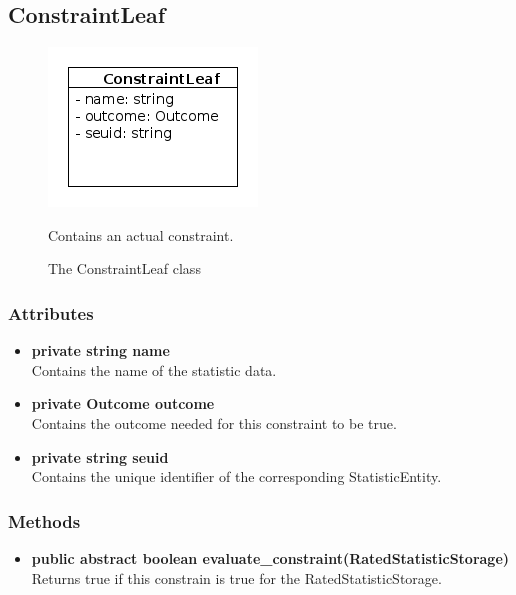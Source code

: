 \subsection{ConstraintLeaf}
\begin{figure}[htbp]
	\begin{minipage}[t]{8cm}
		\vspace{0pt}
		\centering
		\includegraphics[scale=0.6]{./diagram_pictures/reactor/ConstraintLeaf.png}
		\caption{The ConstraintLeaf class}
	\end{minipage}
	\hfill
	\begin{minipage}[t]{8cm}
		\vspace{10pt}
			Contains an actual constraint.
	\end{minipage}
\end{figure}  

\subsubsection{Attributes}
\begin{itemize}
	\item \textbf{ private string name }\\
	Contains the name of the statistic data.
	\item \textbf{ private Outcome outcome }\\
	Contains the outcome needed for this constraint to be true.
	\item \textbf{ private string seuid }\\
	Contains the unique identifier of the corresponding StatisticEntity.
\end{itemize}
\subsubsection{Methods}
\begin{itemize}
	\item \textbf{ public abstract boolean evaluate\_constraint(RatedStatisticStorage) }\\
	Returns true if this constrain is true for the RatedStatisticStorage.
\end{itemize}


